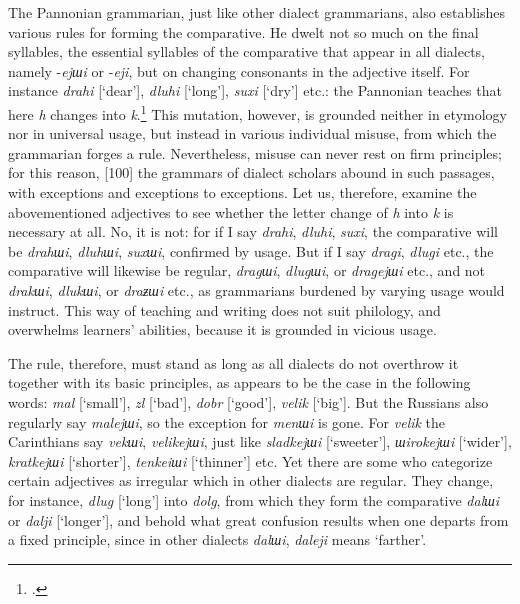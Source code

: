 The Pannonian grammarian, just like other dialect grammarians, also establishes various rules for forming the comparative. He dwelt not so much on the final syllables, the essential syllables of the comparative that appear in all dialects, namely -\textit{ejшi} or -\textit{eji}, but on changing consonants in the adjective itself. For instance \textit{drahi} [‘dear’], \textit{dluhi} [‘long’], \textit{suxi} [‘dry’] etc.: the Pannonian teaches that here \textit{h} changes into \textit{k}.\footnote{\citet[55]{bernolak_grammatica_1790}.} This mutation, however, is grounded neither in etymology nor in universal usage, but instead in various individual misuse, from which the grammarian forges a rule. Nevertheless, misuse can never rest on firm principles; for this reason, [100] the grammars of dialect scholars abound in such passages, with exceptions and exceptions to exceptions. Let us, therefore, examine the abovementioned adjectives to see whether the letter change of \textit{h} into \textit{k} is necessary at all. No, it is not: for if I say \textit{drahi}, \textit{dluhi}, \textit{suxi}, the comparative will be \textit{drahшi}, \textit{dluhшi}, \textit{suxшi}, confirmed by usage. But if I say \textit{dragi}, \textit{dlugi} etc., the comparative will likewise be regular, \textit{dragшi}, \textit{dlugшi}, or \textit{dragejшi} etc., and not \textit{drakшi}, \textit{dlukшi}, or \textit{draƶшi} etc., as grammarians burdened by varying usage would instruct. This way of teaching and writing does not suit philology, and overwhelms learners’ abilities, because it is grounded in vicious usage. 

The rule, therefore, must stand as long as all dialects do not overthrow it together with its basic principles, as appears to be the case in the following words: \textit{mal} [‘small’], \textit{zl} [‘bad’], \textit{dobr} [‘good’], \textit{velik} [‘big’]. But the Russians also regularly say \textit{malejшi}, so the exception for \textit{menшi} is gone. For \textit{velik} the Carinthians say \textit{vekшi}, \textit{velikejшi}, just like \textit{sladkejшi} [‘sweeter’], \textit{шirokejшi} [‘wider’], \textit{kratkejшi} [‘shorter’], \textit{tenkeiшi} [‘thinner’] etc. Yet there are some who categorize certain adjectives as irregular which in other dialects are regular. They change, for instance, \textit{dlug} [‘long’] into \textit{dolg}, from which they form the comparative \textit{dalшi} or \textit{dalji} [‘longer’], and behold what great confusion results when one departs from a fixed principle, since in other dialects \textit{dalшi}, \textit{daleji} means ‘farther’.

